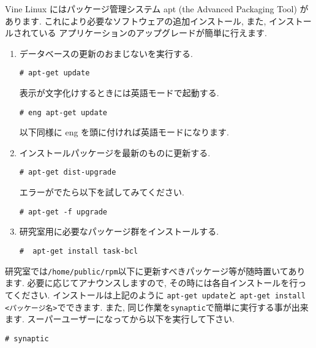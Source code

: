 \documentclass{jarticle}
\begin{document}
Vine Linux にはパッケージ管理システム apt (the Advanced Packaging Tool) があります.
これにより必要なソフトウェアの追加インストール, また, インストールされている
アプリケーションのアップグレードが簡単に行えます.
%
%
\begin{enumerate}
	\item データベースの更新のおまじないを実行する.
\begin{verbatim}
# apt-get update
\end{verbatim}
	      表示が文字化けするときには英語モードで起動する.
\begin{verbatim}
# eng apt-get update
\end{verbatim}
	      以下同様に eng を頭に付ければ英語モードになります.

 \item インストールパッケージを最新のものに更新する.
\begin{verbatim}
# apt-get dist-upgrade
\end{verbatim}
       エラーがでたら以下を試してみてください.
\begin{verbatim}
# apt-get -f upgrade
\end{verbatim}
 \item 研究室用に必要なパッケージ群をインストールする.
\begin{verbatim}
#  apt-get install task-bcl
\end{verbatim}

\end{enumerate}

研究室では\verb|/home/public/rpm|以下に更新すべきパッケージ等が随時置いてあります.
必要に応じてアナウンスしますので, その時には各自インストールを行ってください.
インストールは上記のように
\verb|apt-get update|と \verb|apt-get install <パッケージ名>|でできます.
また, 同じ作業を\verb|synaptic|で簡単に実行する事が出来ます.
スーパーユーザーになってから以下を実行して下さい.
\begin{verbatim}
# synaptic
\end{verbatim}
\end{document}

